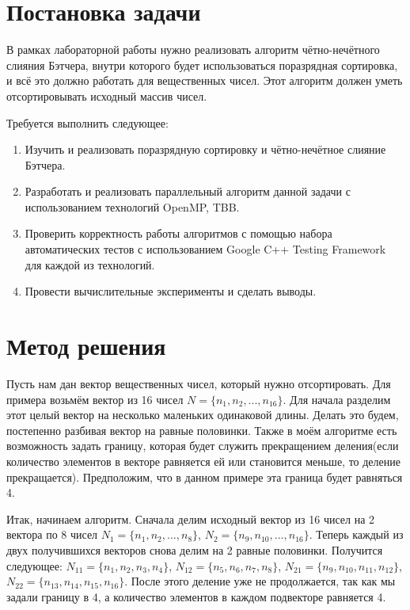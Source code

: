 \documentclass{report}
\begin{document}
\newpage

\section*{Постановка задачи}
В рамках лабораторной работы нужно реализовать алгоритм чётно-нечётного слияния Бэтчера, внутри которого будет использоваться поразрядная сортировка, и всё это должно работать для вещественных чисел. Этот алгоритм должен уметь отсортировывать исходный массив чисел.

\par Требуется выполнить следующее:

\begin{enumerate}
\item Изучить и реализовать поразрядную сортировку и чётно-нечётное слияние Бэтчера.
\item Разработать и реализовать параллельный алгоритм данной задачи с использованием технологий OpenMP, TBB.
\item Проверить корректность работы алгоритмов с помощью набора автоматических тестов с использованием Google C++ Testing Framework для каждой из технологий.
\item Провести вычислительные эксперименты и сделать выводы.
\end{enumerate}
\newpage

\section*{Метод решения}
Пусть нам дан вектор вещественных чисел, который нужно отсортировать. Для примера возьмём вектор из 16 чисел $N = \{n_1, n_2, ..., n_{16}\}$. Для начала разделим этот целый вектор на несколько маленьких одинаковой длины. Делать это будем, постепенно разбивая вектор на равные половинки. Также в моём алгоритме есть возможность задать границу, которая будет служить прекращением деления(если количество элементов в векторе равняется ей или становится меньше, то деление прекращается). Предположим, что в данном примере эта граница будет равняться 4.

\par Итак, начинаем алгоритм. Сначала делим исходный вектор из 16 чисел на 2 вектора по 8 чисел $N_1 = \{n_1, n_2, ..., n_8\}$, $N_2 = \{n_9, n_{10}, ..., n_{16}\}$. Теперь каждый из двух получившихся векторов снова делим на 2 равные половинки. Получится следующее: $N_{11} = \{n_1, n_2, n_3, n_4\}$, $N_{12} = \{n_5, n_6, n_7, n_8\}$, $N_{21} = \{n_9, n_{10}, n_{11}, n_{12}\}$, $N_{22} = \{n_{13}, n_{14}, n_{15}, n_{16}\}$. После этого деление уже не продолжается, так как мы задали границу в 4, а количество элементов в каждом подвекторе равняется 4.
\end{document}
